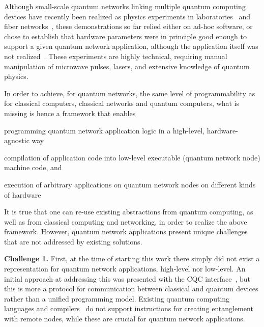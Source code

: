 Although small-scale quantum networks linking multiple quantum computing devices have recently been realized as physics experiments in laboratories~\cite{moehring_2007_ion_traps,ritter_2012_elementary,hofmann_2012_heralded,stockill_2017_phasetuned,jing2019entanglement,stephenson_2020_highrate,pompili_2021_multinode,krutyanskiy_entanglement_2023} and fiber networks~\cite{liu2024creation,stolk2024metropolitan,knaut2024entanglement}, these demonstrations so far relied either on ad-hoc software, or chose to establish that hardware parameters were in principle good enough to support a given quantum network application, although the application itself was not realized~\cite{nadlinger_device-independent_2022,liu_2022_photonic_diqkd,zhang_2022_diqkd}.
These experiments are highly technical, requiring manual manipulation of microwave pulses, lasers, and extensive knowledge of quantum physics.

In order to achieve, for quantum networks, the same level of programmability as for classical computers, classical networks and quantum computers, what is missing is hence a framework that enables
\begin{inlinelist}
\item programming quantum network application logic in a high-level, hardware-agnostic way
\item compilation of application code into low-level executable (quantum network node) machine code, and
\item execution of arbitrary applications on quantum network nodes on different kinds of hardware
\end{inlinelist}

It is true that one can re-use existing abstractions from quantum computing, as well as from classical computing and networking, in order to realize the above framework.
However, quantum network applications present unique challenges that are not addressed by existing solutions.




\textbf{Challenge 1.} First, at the time of starting this work there simply did not exist a representation for quantum network applications, high-level nor low-level.
An initial approach at addressing this was presented with the CQC interface~\cite{dahlberg2018simulaqron}, but this is more a protocol for communication between classical and quantum devices rather than a unified programming model.
Existing quantum computing languages and compilers~\cite{heim_quantum_2020, larose_overview_2019} do not support instructions for creating entanglement with remote nodes, while these are crucial for quantum network applications.

